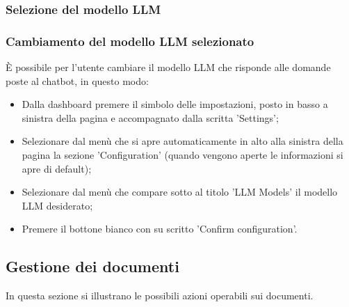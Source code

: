 \documentclass[10pt, a4paper]{article}
\begin{document}
\subsubsection{Selezione del modello LLM}

\subsubsection{Cambiamento del modello LLM selezionato}
È possibile per l'utente cambiare il modello LLM che risponde alle domande poste al chatbot, in questo modo:
\begin{itemize}
    \item Dalla dashboard premere il simbolo delle impostazioni, posto in basso a sinistra della pagina e accompagnato dalla scritta 'Settings';
    \item Selezionare dal menù che si apre automaticamente in alto alla sinistra della pagina la sezione 'Configuration' (quando vengono aperte le informazioni si apre di default);
    \item Selezionare dal menù che compare sotto al titolo 'LLM Models' il modello LLM desiderato;
    \item Premere il bottone bianco con su scritto 'Confirm configuration'.
\end{itemize}

\subsection{Gestione dei documenti}
In questa sezione si illustrano le possibili azioni operabili sui documenti.
\end{document}
